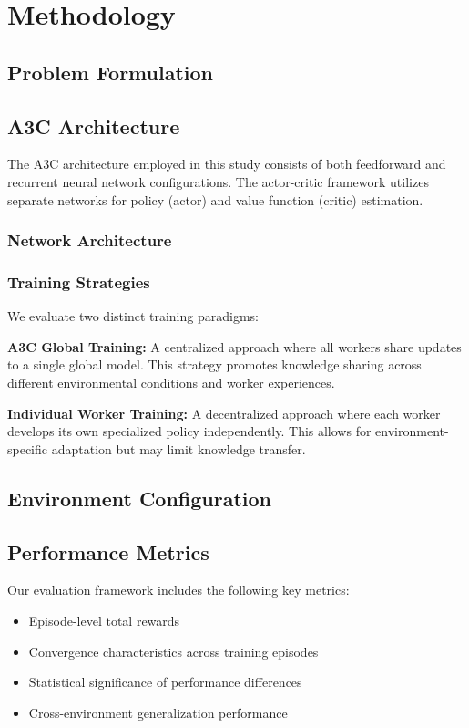 \documentclass[journal]{IEEEtran}
\begin{document}
\section{Methodology}
\label{sec:methodology}

\subsection{Problem Formulation}

\subsection{A3C Architecture}
The A3C architecture employed in this study consists of both feedforward and recurrent neural network configurations. The actor-critic framework utilizes separate networks for policy (actor) and value function (critic) estimation.

\subsubsection{Network Architecture}

\subsubsection{Training Strategies}
We evaluate two distinct training paradigms:

\textbf{A3C Global Training:} A centralized approach where all workers share updates to a single global model. This strategy promotes knowledge sharing across different environmental conditions and worker experiences.

\textbf{Individual Worker Training:} A decentralized approach where each worker develops its own specialized policy independently. This allows for environment-specific adaptation but may limit knowledge transfer.

\subsection{Environment Configuration}

\subsection{Performance Metrics}
Our evaluation framework includes the following key metrics:
\begin{itemize}
\item Episode-level total rewards
\item Convergence characteristics across training episodes
\item Statistical significance of performance differences
\item Cross-environment generalization performance
\end{itemize}
\end{document}
